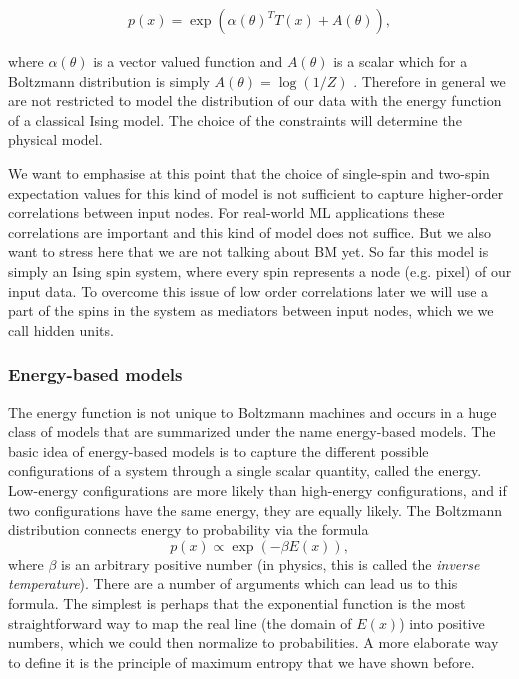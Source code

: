 \documentclass[nofootinbib, superscriptaddress, prl]{revtex4}
\begin{document}
\begin{align}
	p(x) = \exp \left( \alpha(\theta)^T T(x) + A(\theta) \right),
\end{align}

where $\alpha(\theta)$ is a vector valued function and $A(\theta)$ is a scalar which for a Boltzmann distribution is simply $A(\theta) = \log(1/Z)$ \cite{li_learning_2013}. Therefore in general we are not restricted to model the distribution of our data with the energy function of a classical Ising model. The choice of the constraints will determine the physical model.


We want to emphasise at this point that the choice of single-spin and two-spin expectation values for this kind of model is not sufficient to capture higher-order correlations between input nodes. For real-world ML applications these correlations are important and this kind of model does not suffice. But we also want to stress here that we are not talking about BM yet. So far this model is simply an Ising spin system, where every spin represents a node (e.g. pixel) of our input data. To overcome this issue of low order correlations later we will use a part of the spins in the system as mediators between input nodes, which we we call hidden units.


\subsubsection{Energy-based models}

The energy function is not unique to Boltzmann machines and occurs in a huge class of models that are summarized under the name energy-based models. The basic idea of energy-based models is to capture the different possible configurations of a system through a single scalar quantity, called the energy. Low-energy configurations are more likely than high-energy configurations, and if two configurations have the same energy, they are equally likely. The Boltzmann distribution connects energy to probability via the formula
\begin{equation}
 p(x) \propto \exp(-\beta E(x)),
\end{equation}
where $\beta$ is an arbitrary positive number (in physics, this is called the \emph{inverse temperature}). 
There are a number of arguments which can lead us to this formula. The simplest is perhaps that the exponential function is the most straightforward way to map the real line (the domain of $E(x)$) into positive numbers, which we could then normalize to probabilities. A more elaborate way to define it is the principle of maximum entropy that we have shown before.
\end{document}
